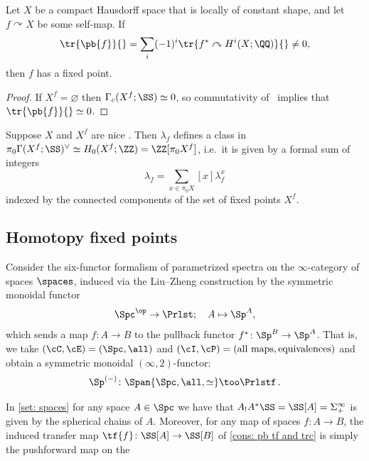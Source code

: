   \begin{cor}
    Let $X$ be a compact Hausdorff space that is locally of constant shape, and let $f\curvearrowright X$ be some self-map. If
    \[
      \tr{\pb{f}}{} = \sum_i (-1)^i\tr{f^*\curvearrowright H^i(X;\QQ )}{}\neq 0,
    \]
    then $f$ has a fixed point.
  \end{cor}
  \begin{proof}
    If $X^f = \varnothing$ then $\Gamma_c(X^f;\SS )\simeq 0$, so commutativity of~ implies that $\tr{\pb{f}}{}\simeq 0$.
  \end{proof}

\begin{rmk}
    Suppose $X$ and $X^f$ are nice . 
    Then $\lambda_f$ defines
    a class in $\pi_0\Gamma(X^f;\SS)^{\vee} \simeq H_0(X^f;\ZZ)=\ZZ[\pi_0X^f]$, i.e.~it is given by a formal sum of integers
    \[ \lambda_f= \sum_{x\in \pi_0X}[x]\lambda_f^{x}\]
    indexed by the connected components of the set of fixed points $X^f$. 
\end{rmk}
  

\subsection{Homotopy fixed points}

\begin{set}\label{set: spaces}
Consider the six-functor formalism of parametrized spectra on the $\infty$-category of spaces $\spaces$, induced via the Liu--Zheng construction by the symmetric monoidal functor
\[
    \Spc^\op\to \Prlst; \quad A \mapsto \Sp^A,
\]
which sends a map $f\colon A\to B$ to the pullback functor $f^*\colon \Sp^B \to \Sp^A $. That is, we take $(\cC ,\cE ) = (\Spc ,\all )$ and $(\cI ,\cP ) = (\textrm{all maps}, \textrm{equivalences})$ and obtain a symmetric monoidal
$(\infty,2)$-functor:
\[ \Sp^{(-)}\colon \Span{\Spc,\all, \simeq} \too \Prlstf\,.\]
\end{set}

In \cref{set: spaces} for any space 
$A\in \Spc$ we have that $A_!A^* \SS = \SS[A]=\Sigma^{\infty}_+$ is given by the spherical chains of $A$. Moreover, for any map of spaces $f\colon A \to B$, the
induced transfer map $\tf{f}\colon \SS[A]\to \SS[B]$ of
\cref{cons: pb tf and trc} is simply the pushforward map 
on the 

